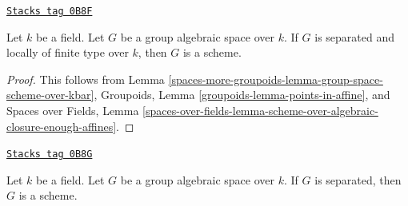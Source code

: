 \begin{lemma}
\label{spaces-more-groupoids-lemma-group-space-scheme-locally-finite-type-over-k}
\href{https://stacks.math.columbia.edu/tag/0B8F}{\texttt{Stacks tag 0B8F}}

Let $k$ be a field. Let $G$ be a group algebraic space over $k$.
If $G$ is separated and locally of finite type over $k$,
then $G$ is a scheme.
\end{lemma}

\begin{proof}
This follows from
Lemma \ref{spaces-more-groupoids-lemma-group-space-scheme-over-kbar},
Groupoids, Lemma \ref{groupoids-lemma-points-in-affine}, and
Spaces over Fields, Lemma
\ref{spaces-over-fields-lemma-scheme-over-algebraic-closure-enough-affines}.
\end{proof}

\begin{proposition}
\label{spaces-more-groupoids-proposition-group-space-scheme-over-field}
\href{https://stacks.math.columbia.edu/tag/0B8G}{\texttt{Stacks tag 0B8G}}

Let $k$ be a field. Let $G$ be a group algebraic space over $k$.
If $G$ is separated, then $G$ is a scheme.
\end{proposition}

